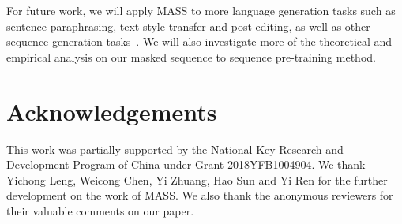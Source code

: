 \documentclass{article}
\begin{document}
	For future work, we will apply MASS to more language generation tasks such as sentence paraphrasing, text style transfer and post editing, as well as other sequence generation tasks~\citep{ren2019almost}. We will also investigate more of the theoretical and empirical analysis on our masked sequence to sequence pre-training method.
	
	\section*{Acknowledgements}
	This work was partially supported by the National Key Research and Development Program of China under Grant 2018YFB1004904. We thank Yichong Leng, Weicong Chen, Yi Zhuang, Hao Sun and Yi Ren for the further development on the work of MASS. We also thank the anonymous reviewers for their valuable comments on our paper.
	
	

	
	
\end{document}
